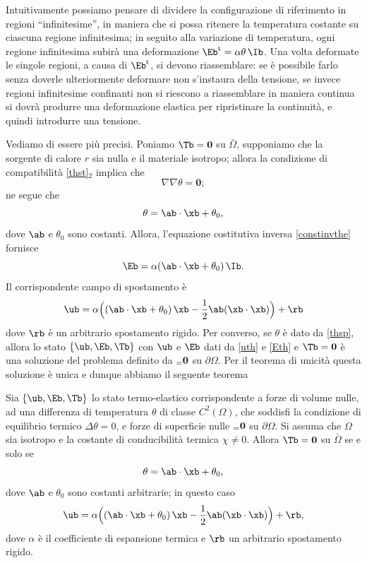 Intuitivamente possiamo pensare di dividere la configurazione di riferimento in regioni ``infinitesime'', in maniera che
si possa ritenere la temperatura costante su ciascuna regione infinitesima; in seguito alla variazione di temperatura, ogni regione infinitesima subirà
una deformazione $\Eb^{\rm t}=\alpha\theta\, \Ib$. Una volta deformate le singole regioni, a causa di $\Eb^{\rm t}$, si devono riassemblare: se è 
possibile farlo senza doverle ulteriormente deformare non s’instaura della tensione,
se invece regioni infinitesime confinanti non si riescono a riassemblare in
maniera continua si dovrà produrre una deformazione elastica per ripristinare la
continuità, e quindi introdurre una tensione.

Vediamo di essere più precisi. Poniamo $\Tb=\mathbf{0}$ su $\bar{\Omega}$, supponiamo che la sorgente di calore $r$ sia nulla e il materiale isotropo; allora la condizione di compatibilità \eqref{thst}$_2$ implica che 
\begin{equation}
\nabla \nabla\theta=\mathbf{0};
\end{equation}
ne segue che
\begin{equation}\label{thsp}
\theta= \ab \cdot \xb+\theta_0,
\end{equation}
dove $\ab$ e $\theta_0$ sono costanti. Allora, l'equazione costitutiva inversa \eqref{constinvthe} fornisce
\begin{equation}\label{Eth}
	\Eb =\alpha ( \ab \cdot \xb+\theta_0)\,\Ib.
\end{equation}
Il corrispondente campo di spostamento è
\begin{equation}\label{uth}
\ub=\alpha \Big( (\ab\cdot \xb +\theta_0)\,\xb-\frac12 \ab(\xb\cdot\xb) \Big)+\rb
\end{equation}
dove $\rb$ è un arbitrario spostamento rigido. Per converso, se $\theta$ è dato da \eqref{thsp}, allora lo stato $\{\ub, \Eb, \Tb\}$ con $\ub$ e $\Eb$ dati da \eqref{uth} e \eqref{Eth} e $\Tb=\mathbf{0}$ è una soluzione del problema definito da $\sb=\mathbf{0}$ su $\partial\Omega$. Per il teorema di unicità questa soluzione è unica e dunque abbiamo il seguente teorema
\begin{definition}
Sia $\{ \ub, \Eb, \Tb\}$ lo stato termo-elastico corrispondente  a forze di volume nulle, ad una differenza di temperatura $\theta$ di classe $C^2(\Omega)$, che soddisfi la condizione di equilibrio termico $\Delta\theta=0$, e forze di superficie nulle $\sb=\mathbf{0}$ su $\partial\Omega$. Si assuma che $\Omega$ sia isotropo e la costante di conducibilità termica $\chi\neq 0$. Allora $\Tb=\mathbf{0}$ su $\bar{\Omega}$ se e solo se
\begin{equation}
\theta= \ab \cdot \xb+\theta_0,
\end{equation}
dove $\ab$ e $\theta_0$ sono costanti arbitrarie; in questo caso 
\begin{equation}
	\ub=\alpha \Big( (\ab\cdot \xb +\theta_0)\,\xb-\frac12 \ab(\xb\cdot\xb) \Big)+\rb,
\end{equation}
dove $\alpha$ è il coefficiente di espansione termica e $\rb$ un arbitrario spostamento rigido.
\end{definition}

